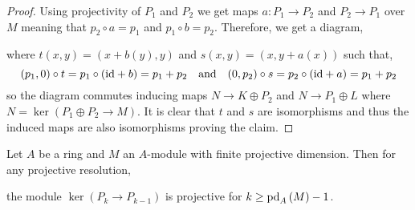 \documentclass[12pt]{article}
\begin{document}
\begin{proof}
Using projectivity of $P_1$ and $P_2$ we get maps $a : P_1 \to P_2$ and $P_2 \to P_1$ over $M$ meaning that $p_2 \circ a = p_1$ and $p_1 \circ b = p_2$. Therefore, we get a diagram,
\begin{center}
\end{center}
where $t(x,y) = (x + b(y), y)$ and $s(x,y) = (x, y + a(x))$ such that,
\[ (p_1, 0) \circ t = p_1 \circ (\mathrm{id} + b) = p_1 + p_2 \quad \text{and} \quad (0, p_2) \circ s = p_2 \circ (\mathrm{id} + a) = p_1 + p_2 \]
so the diagram commutes inducing maps $N \to K \oplus P_2$ and $N \to P_1 \oplus L$ where $N = \ker{(P_1 \oplus P_2 \to M)}$. It is clear that $t$ and $s$ are isomorphisms and thus the induced maps are also isomorphisms proving the claim.
\end{proof}

\begin{lemma}
Let $A$ be a ring and $M$ an $A$-module with finite projective dimension. Then for any projective resolution,
\begin{center}
\end{center}
the module $\ker{(P_k \to P_{k-1})}$ is projective for $k \ge \mathrm{pd}_{A} \left( M \right) - 1$.
\end{lemma}
\end{document}

